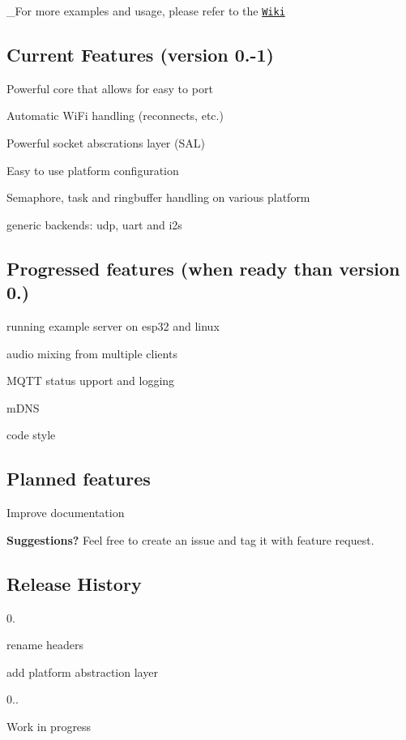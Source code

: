  \+\_\+\+For more examples and usage, please refer to the \href{https://github.com/RoseLeBlood/openess/wiki}{\tt Wiki}

\subsection*{Current Features (version 0.-\/1)}


\begin{DoxyItemize}
\item Powerful core that allows for easy to port
\item Automatic Wi\+Fi handling (reconnects, etc.)
\item Powerful socket abscrations layer (S\+AL)
\item Easy to use platform configuration
\item Semaphore, task and ringbuffer handling on various platform
\item generic backends\+: udp, uart and i2s
\end{DoxyItemize}

\subsection*{Progressed features (when ready than version 0.)}


\begin{DoxyItemize}
\item running example server on esp32 and linux
\item audio mixing from multiple clients
\item M\+Q\+TT status upport and logging
\item m\+D\+NS
\item code style
\end{DoxyItemize}

\subsection*{Planned features}


\begin{DoxyItemize}
\item Improve documentation
\item {\bfseries Suggestions?} Feel free to create an issue and tag it with feature request.
\end{DoxyItemize}

\subsection*{Release History}


\begin{DoxyItemize}
\item 0.
\begin{DoxyItemize}
\item rename headers
\item add platform abstraction layer
\end{DoxyItemize}
\item 0..
\begin{DoxyItemize}
\item Work in progress 
\end{DoxyItemize}
\end{DoxyItemize}